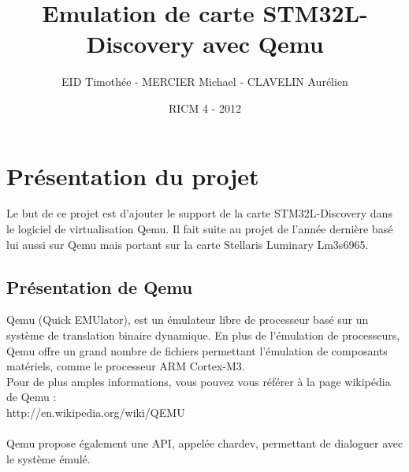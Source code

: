 \documentclass{article}
\title{Emulation de carte STM32L-Discovery avec Qemu}
\author{EID Timothée - MERCIER Michael - CLAVELIN Aurélien}
\date{RICM 4 - 2012}
\makeatletter
\def\thetitle{\@title}
\def\theauthor{\@author}
\def\thedate{\@date}
\makeatother
\begin{document}
\begin{titlepage}
\centering

\vfill

{\Huge\bfseries \thetitle}

\vskip 1cm

{\Large \theauthor}

\vskip 0.5cm

\thedate

\vfill
\end{titlepage}


\tableofcontents

\newpage
\section{Présentation du projet}
	 Le but de ce projet est d'ajouter le support de la carte STM32L-Discovery dans le logiciel de virtualisation Qemu. 
	 Il fait suite au projet de l'année dernière basé lui aussi sur Qemu mais portant sur la carte Stellaris Luminary Lm3s6965.
	 
	 \subsection{Présentation de Qemu}
		Qemu (Quick EMUlator), est un émulateur libre de processeur basé sur un système de translation binaire dynamique. En plus de 
		l'émulation de processeurs, Qemu offre un grand nombre de fichiers permettant l'émulation de composants matériels, comme le 
		processeur ARM Cortex-M3. \\
		Pour de plus amples informations, vous pouvez vous référer à la page wikipédia de Qemu : \\ http://en.wikipedia.org/wiki/QEMU \\
		\\
		Qemu propose également une API, appelée chardev, permettant de dialoguer avec le système émulé.
	 
\end{document}
